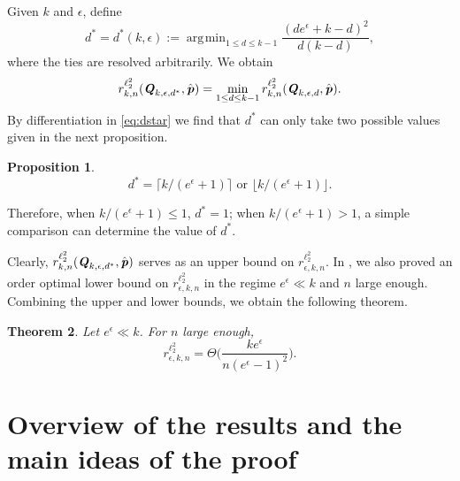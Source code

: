 \documentclass[11pt,onecolumn]{IEEEtran}
\newtheorem{theorem}{Theorem}[section]
\newtheorem{proposition}[theorem]{Proposition}
\def\mathbi#1{{\textbf{\textit #1}}}
\DeclareMathOperator*{\argmin}{arg\!\min}
\begin{document}
Given $k$ and $\epsilon$, define
\begin{equation}\label{eq:dstar}
d^\ast = d^\ast(k,\epsilon)
:= \argmin_{1\le d \le k-1}  \frac{(d e^{\epsilon} + k-d)^2 }{d(k-d)},
\end{equation}
where the ties are resolved arbitrarily.
We obtain 
  \begin{equation}\label{eq:rdstar}
r_{k,n}^{\ell_2^2} (\mathbi{Q}_{k,\epsilon,d^\ast}, \hat{\mathbi{p}}) = 
\min_{1\le d \le k-1} r_{k,n}^{\ell_2^2} (\mathbi{Q}_{k,\epsilon,d}, \hat{\mathbi{p}}).
  \end{equation}
By differentiation in \eqref{eq:dstar} we find that $d^\ast$ can only take two possible values given in the next proposition.
\begin{proposition} 
$$
d^\ast=\lceil k/(e^{\epsilon}+1) \rceil \text{ or } \lfloor k/(e^{\epsilon}+1)\rfloor.
$$
\end{proposition}
Therefore, when $k/(e^{\epsilon}+1) \le 1$, $d^\ast=1$; when $k/(e^{\epsilon}+1) > 1$, a simple comparison can determine the value of $d^\ast$.

Clearly, $r_{k,n}^{\ell_2^2} (\mathbi{Q}_{k,\epsilon,d^\ast}, \hat{\mathbi{p}})$ serves as an upper bound on
$r_{\epsilon, k,n}^{\ell_2^2}$. In \cite{Ye17}, we also proved an order optimal lower bound on 
$r_{\epsilon, k,n}^{\ell_2^2}$ in the regime $e^{\epsilon} \ll k$ and $n$ large enough.
Combining the upper and lower bounds, we obtain the following theorem.

\begin{theorem}\label{Thm:last}{\rm \cite{Ye17}} Let $e^{\epsilon} \ll k$. For $n$ large enough,
$$
r_{\epsilon, k,n}^{\ell_2^2} =  \Theta \Big( \frac{k e^{\epsilon}}{n (e^{\epsilon}-1)^2} \Big).
$$
\end{theorem}


\section{Overview of the results and the main ideas of the proof}\label{Sect:ovr}
\end{document}
